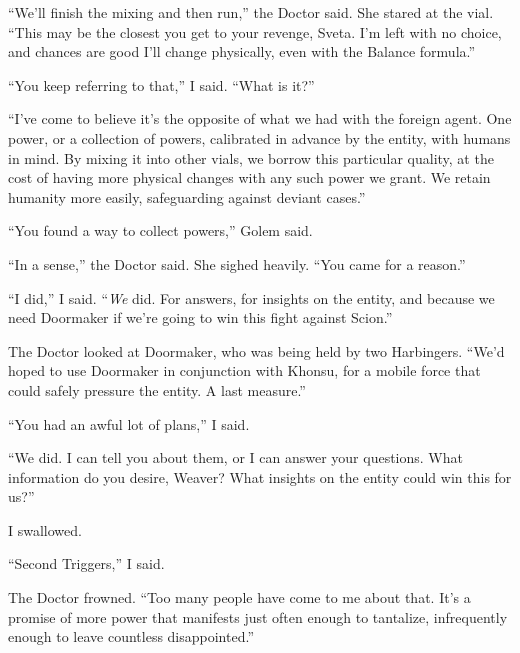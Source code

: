``We'll finish the mixing and then run,'' the Doctor said.  She stared at the vial.  ``This may be the closest you get to your revenge, Sveta.  I'm left with no choice, and chances are good I'll change physically, even with the Balance formula.''



``You keep referring to that,'' I said.  ``What is it?''



``I've come to believe it's the opposite of what we had with the foreign agent.  One power, or a collection of powers, calibrated in advance by the entity, with humans in mind.  By mixing it into other vials, we borrow this particular quality, at the cost of having more physical changes with any such power we grant.  We retain humanity more easily, safeguarding against deviant cases.''



``You found a way to collect powers,'' Golem said.



``In a sense,'' the Doctor said.  She sighed heavily.  ``You came for a reason.''



``I did,'' I said.  ``\emph{We} did.  For answers, for insights on the entity, and because we need Doormaker if we're going to win this fight against Scion.''



The Doctor looked at Doormaker, who was being held by two Harbingers.  ``We'd hoped to use Doormaker in conjunction with Khonsu, for a mobile force that could safely pressure the entity.  A last measure.''



``You had an awful lot of plans,'' I said.



``We did.  I can tell you about them, or I can answer your questions.  What information do you desire, Weaver?  What insights on the entity could win this for us?''



I swallowed.



``Second Triggers,'' I said.



The Doctor frowned.  ``Too many people have come to me about that.  It's a promise of more power that manifests just often enough to tantalize, infrequently enough to leave countless disappointed.''




